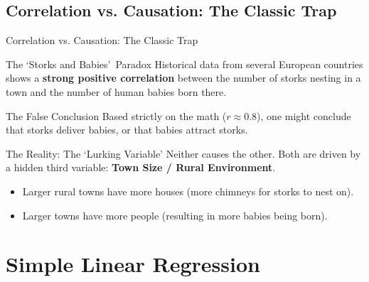 \subsection{Correlation vs. Causation: The Classic Trap}
\begin{frame}[allowframebreaks]{Correlation vs. Causation: The Classic Trap}
    \begin{block}{The \lq Storks and Babies\rq\ Paradox}
        Historical data from several European countries shows a \textbf{strong positive correlation} between the number of storks nesting in a town and the number of human babies born there.
    \end{block}

    \begin{alertblock}{The False Conclusion}
        Based strictly on the math ($r \approx 0.8$), one might conclude that storks deliver babies, or that babies attract storks.
    \end{alertblock}

    \begin{block}{The Reality: The \lq Lurking Variable\rq }
        Neither causes the other. Both are driven by a hidden third variable: \textbf{Town Size / Rural Environment}.
        \begin{itemize}
            \item Larger rural towns have more houses (more chimneys for storks to nest on).
            \item Larger towns have more people (resulting in more babies being born).
        \end{itemize}
    \end{block}
\end{frame}




\section{Simple Linear Regression}
